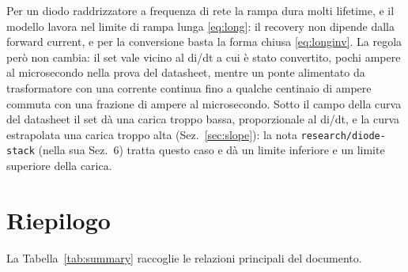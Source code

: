 \documentclass[10pt,a4paper]{scrartcl}
\begin{document}
Per un diodo raddrizzatore a frequenza di rete la rampa dura molti lifetime, e il modello lavora nel limite di rampa lunga \eqref{eq:long}: il recovery non dipende dalla forward current, e per la conversione basta la forma chiusa \eqref{eq:longinv}. La regola però non cambia: il set vale vicino al di/dt a cui è stato convertito, pochi ampere al microsecondo nella prova del datasheet, mentre un ponte alimentato da trasformatore con una corrente continua fino a qualche centinaio di ampere commuta con una frazione di ampere al microsecondo. Sotto il campo della curva del datasheet il set dà una carica troppo bassa, proporzionale al di/dt, e la curva estrapolata una carica troppo alta (Sez.~\ref{sec:slope}): la nota \texttt{research/diode-stack} (nella sua Sez.~6) tratta questo caso e dà un limite inferiore e un limite superiore della carica.

\section{Riepilogo}
\label{sec:summary}
La Tabella~\ref{tab:summary} raccoglie le relazioni principali del documento.
\end{document}

